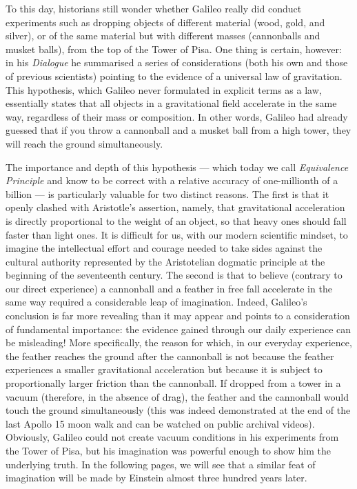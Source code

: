 To this day, historians still wonder whether Galileo really did conduct experiments such
as dropping objects of different material (wood, gold, and silver), or of the same
material but with different masses (cannonballs and musket balls), from the top of the
Tower of Pisa. One thing is certain, however: in his \emph{Dialogue} he summarised a
series of considerations (both his own and those of previous scientists) pointing to the
evidence of a universal law of gravitation. This hypothesis, which Galileo never
formulated in explicit terms as a law, essentially states that all objects in a
gravitational field accelerate in the same way, regardless of their mass or composition.
In other words, Galileo had already guessed that if you throw a cannonball and a musket
ball from a high tower, they will reach the ground simultaneously.

The importance and depth of this hypothesis --- which today we call \emph{Equivalence}
\emph{Principle} and know
to be correct with a relative accuracy of one-millionth of a billion --- is particularly
valuable for two distinct reasons. The first is that it openly clashed with Aristotle's
assertion, namely, that gravitational acceleration is directly proportional to the
weight of an object, so that heavy ones should fall faster than light ones. It is
difficult for us, with our modern scientific mindset, to imagine the intellectual effort
and courage needed to take sides against the cultural authority represented by the
Aristotelian dogmatic principle at the beginning of the seventeenth century. The second
is that to believe (contrary to our direct experience) a cannonball and a feather in
free fall accelerate in the same way required a considerable leap of
imagination. Indeed, Galileo's conclusion is far more revealing than it may appear and
points to a consideration of fundamental importance: the evidence gained through our
daily experience can be misleading! More specifically, the reason for which, in our
everyday experience, the feather reaches the ground after the cannonball is not because
the feather experiences a smaller gravitational acceleration but because it is subject
to proportionally larger friction than the cannonball. If dropped from a tower in a
vacuum (therefore, in the absence of drag), the feather and the cannonball
would touch the ground simultaneously (this was indeed demonstrated at the end of the
last Apollo 15 moon walk and can be watched on public archival videos). Obviously,
Galileo could not create vacuum conditions in his experiments from the Tower of Pisa,
but his imagination was powerful enough to show him the underlying truth. In the
following pages, we will see that a similar feat of imagination will be made by Einstein
almost three hundred years later.

